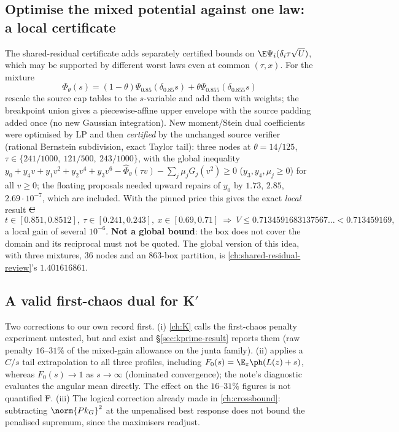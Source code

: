 \subsection{Optimise the mixed potential against one law: a local certificate}\label{sec:pinned-local}
The shared-residual certificate adds separately certified bounds on $\E\Psi_i(\delta_i\tau\sqrt U)$, which may be supported by different worst laws even at common $(\tau,x)$. For the mixture
\begin{equation}\label{eq:pinned6}
\Phi_\theta(s)=(1-\theta)\Psi_{0.85}(\delta_{0.85}s)+\theta\Psi_{0.855}(\delta_{0.855}s)
\end{equation}
rescale the source cap tables to the $s$-variable and add them with weights; the breakpoint union gives a piecewise-affine upper envelope with the source padding added once (no new
Gaussian integration). New moment/Stein dual coefficients were optimised by LP and then \emph{certified} by the unchanged source verifier (rational Bernstein subdivision, exact Taylor tail):
three nodes at $\theta=14/125$, $\tau\in\{241/1000,\ 121/500,\ 243/1000\}$, with the global inequality $y_0+y_4v+y_1v^2+y_2v^4+y_3v^6-\widehat\Phi_\theta(\tau v)-\sum_j\mu_jG_j(v^2)\ge0$
($y_3,y_4,\mu_j\ge0$) for all $v\ge0$; the floating proposals needed upward repairs of $y_0$ by $1.73$, $2.85$, $2.69\cdot10^{-7}$, which are included. With the pinned price this gives the
exact \emph{local} result \st{C}
\begin{equation}\label{eq:pinned7}
t\in[0.851,0.8512],\ \tau\in[0.241,0.243],\ x\in[0.69,0.71]\ \Longrightarrow\ V\le0.7134591683137567\ldots<0.713459169 ,
\end{equation}
a local gain of several $10^{-6}$. \textbf{Not a global bound}: the box does not cover the domain and its reciprocal must not be quoted. The global version of this idea, with three mixtures,
36 nodes and an 863-box partition, is \autoref{ch:shared-residual-review}'s $1.401616861$.

\subsection{A valid first-chaos dual for K$'$}\label{sec:pinned-kprime}
Two corrections to our own record first. (i) \autoref{ch:K} calls the first-chaos penalty experiment untested, but  and  exist and
\S\ref{sec:kprime-result} reports them (raw penalty $16$--$31\%$ of the mixed-gain allowance on the junta family). (ii)  applies a $C/s$ tail extrapolation to all three profiles,
including $F_0(s)=\E_z\ph(L(z)+s)$, whereas $F_0(s)\to1$ as $s\to\infty$ (dominated convergence); the note's diagnostic evaluates the angular mean directly. The effect on the $16$--$31\%$
figures is not quantified \st{F}. (iii) The logical correction already made in \autoref{ch:crossbound}: subtracting $\norm{Pk_G}^2$ at the unpenalised best response does not bound the
penalised supremum, since the maximisers readjust.

